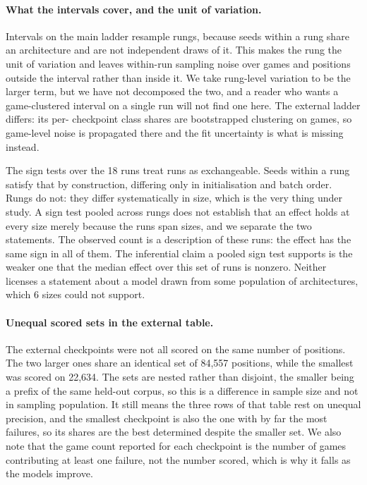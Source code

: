 \documentclass[11pt]{article}
\begin{document}
\paragraph{What the intervals cover, and the unit of variation.}
Intervals on the main ladder resample rungs, because seeds within a rung share an
architecture and are not independent draws of it. This makes the rung the unit of
variation and leaves within-run sampling noise over games and positions outside the
interval rather than inside it. We take rung-level variation to be the larger term,
but we have not decomposed the two, and a reader who wants a game-clustered interval
on a single run will not find one here. The external ladder differs: its per-
checkpoint class shares are bootstrapped clustering on games, so game-level noise is
propagated there and the fit uncertainty is what is missing instead.

The sign tests over the 18 runs treat runs as exchangeable. Seeds within a rung
satisfy that by construction, differing only in initialisation and batch order.
Rungs do not: they differ systematically in size, which is the very thing under
study. A sign test pooled across rungs does not establish that an effect holds at every size
merely because the runs span sizes, and we separate the two statements. The observed
count is a description of these runs: the effect has the same sign in all of them.
The inferential claim a pooled sign test supports is the weaker one that the median
effect over this set of runs is nonzero. Neither licenses a statement about a model
drawn from some population of architectures, which 6 sizes could not support.

\paragraph{Unequal scored sets in the external table.}
The external checkpoints were not all scored on the same number of positions. The
two larger ones share an identical set of 84,557 positions, while the smallest was
scored on 22,634. The sets are nested rather than disjoint, the smaller being a
prefix of the same held-out corpus, so this is a difference in sample size and not
in sampling population. It still means the three rows of that table rest on unequal
precision, and the smallest checkpoint is also the one with by far the most failures,
so its shares are the best determined despite the smaller set. We also note that the
game count reported for each checkpoint is the number of games contributing at least
one failure, not the number scored, which is why it falls as the models improve.
\end{document}
